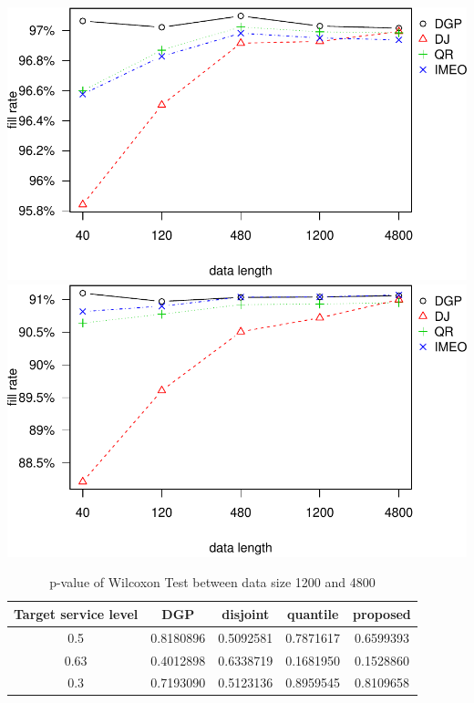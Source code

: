 \documentclass[
]{article}
\begin{document}
\includegraphics{linear-norm-plot_files/figure-latex/fr-2.pdf}
\includegraphics{linear-norm-plot_files/figure-latex/fr-3.pdf}

\begin{table}

\caption{\label{tab:Wilcoxon}p-value of Wilcoxon Test between data size 1200 and 4800}
\centering
\begin{tabular}[t]{ccccc}
\toprule
Target service level & DGP & disjoint & quantile & proposed\\
\midrule
\rowcolor{gray!6}  0.5 & 0.8180896 & 0.5092581 & 0.7871617 & 0.6599393\\
0.63 & 0.4012898 & 0.6338719 & 0.1681950 & 0.1528860\\
\rowcolor{gray!6}  0.3 & 0.7193090 & 0.5123136 & 0.8959545 & 0.8109658\\
\bottomrule
\end{tabular}
\end{table}
\end{document}
